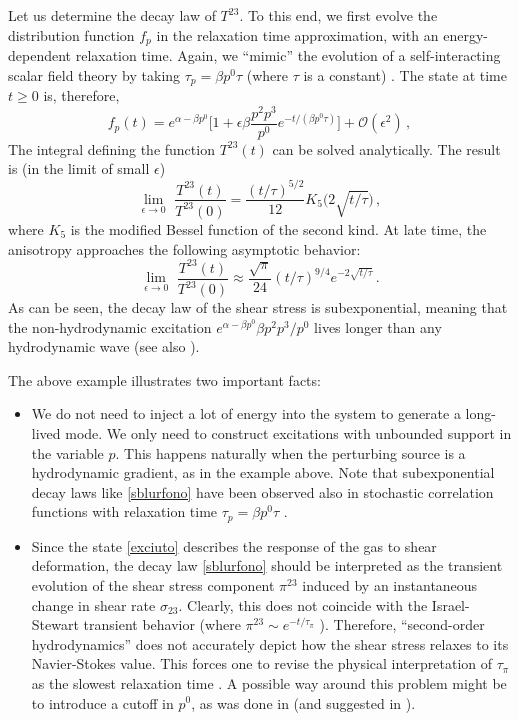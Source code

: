 \documentclass[a4paper, amsfonts, amssymb, amsmath, reprint, showkeys, nofootinbib, twoside, onecolumn,notitlepage,,longbibliography]{revtex4-2}
\theoremstyle{definition}
\theoremstyle{theorem}
\theoremstyle{corollary}
\begin{document}
Let us determine the decay law of $T^{23}$. To this end, we first evolve the distribution function $f_p$ in the relaxation time approximation, with an energy-dependent relaxation time. Again, we ``mimic'' the evolution of a self-interacting scalar field theory by taking $\tau_p=\beta p^0 \tau$ (where $\tau$ is a constant) \cite{Denicol:2022bsq}. The state at time $t\geq 0$ is, therefore,
\begin{equation}\label{exciutot}
f_p(t)= e^{\alpha -\beta p^0} \bigg[ 1+\epsilon \beta \dfrac{p^2 p^3}{p^0} e^{-t/(\beta p^0 \tau)}\bigg] +\mathcal{O}(\epsilon^2) \, ,
\end{equation}
The integral defining the function $T^{23}(t)$ can be solved analytically. The result is (in the limit of small $\epsilon$)
\begin{equation}
 \lim_{\epsilon \rightarrow 0} \, \,  \dfrac{T^{23}(t)}{T^{23}(0)}= \dfrac{(t/\tau)^{5/2}}{12} K_5 \big(2\sqrt{t/\tau}\big) \, ,
\end{equation}
where $K_5$ is the modified Bessel function of the second kind. At late time, the anisotropy approaches the following asymptotic behavior:
\begin{equation}\label{sblurfono}
\lim_{\epsilon \rightarrow 0}\,  \, \dfrac{T^{23}(t)}{T^{23}(0)}\approx \dfrac{\sqrt{\pi}}{24} (t/\tau)^{9/4} e^{-2\sqrt{t/\tau}} \, .    
\end{equation}
As can be seen, the decay law of the shear stress is subexponential, meaning that the non-hydrodynamic excitation $e^{\alpha -\beta p^0}  \beta p^2 p^3/p^0$ lives longer than any hydrodynamic wave (see also \cite{Kurkela:2017xis}). 

The above example illustrates two important facts:
\begin{itemize}
\item[1.] We do not need to inject a lot of energy into the system to generate a long-lived mode. We only need to construct excitations with unbounded support in the variable $p$. This happens naturally when the perturbing source is a hydrodynamic gradient, as in the example above. Note that subexponential decay laws like \eqref{sblurfono} have been observed also in stochastic correlation functions with relaxation time $\tau_p=\beta p^0 \tau$ \cite{RochaGavassinoFluctu:2024afv}.
\item[2.] Since the state \eqref{exciuto} describes the response of the gas to shear deformation, the decay law \eqref{sblurfono} should be interpreted as the transient evolution of the shear stress component $\pi^{23}$ induced by an instantaneous change in shear rate $\sigma_{23}$. Clearly, this does not coincide with the Israel-Stewart transient behavior (where $\pi^{23}{\sim} e^{-t/\tau_\pi}$ \cite[\S 6.5.1]{rezzolla_book}). Therefore, ``second-order hydrodynamics'' does not accurately depict how the shear stress relaxes to its Navier-Stokes value. This forces one to revise the physical interpretation of $\tau_\pi$ as the slowest relaxation time \cite{WagnerGavassino2023jgq}. A possible way around this problem might be to introduce a cutoff in $p^0$, as was done in \cite{Gavassino2024InfiniteOrder} (and suggested in \cite{RochaCut2024cge}).
\end{itemize}
\end{document}
